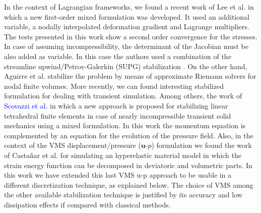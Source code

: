 \documentclass[11pt,english]{article}
\newcommand{\LM}[1]{\textcolor{blue}{#1}}
\begin{document}
In the context of Lagrangian frameworks, we found a recent work of Lee et al. \cite{lee2014development} in which a new first-order mixed formulation was developed. It used an additional variable, a nodally interpolated deformation gradient and Lagrange multipliers. The tests presented in this work show a second order convergence for the stresses. In case of assuming incompressibility, the  determinant of the Jacobian must be  also added as variable. In this case the authors used a combination of the streamline upwind/Petrov-Galerkin (SUPG) stabilization \cite{hughes1987new}. On the other hand, Aguirre et al. \cite{aguirre2014vertex} stabilize the problem by means of approximate Riemann solvers for nodal finite volumes.
More recently, we can found interesting stabilized formulation for dealing with transient simulation. Among others, the work of \LM{Scovazzi et al. \cite{scovazzi2016simple,abboud2021variational}} in which a new approach is proposed for stabilizing linear tetrahedral finite elements in case of nearly incompressible transient solid mechanics using a mixed formulation. In this work the momentum equation is complemented by an equation for the evolution of the pressure field. Also, in the context of the VMS displacement/pressure ($\boldsymbol{u}$-$p$) formulation we found the work of Castañar et al. \cite{castanar2020stabilized} for simulating an hyperelastic material model in which the strain energy function can be decomposed in deviatoric and volumetric parts. In this work we have extended this last VMS u-p approach to be usable in a different discretization technique, as explained below. The choice of VMS among the other available stabilization technique is justified by its accuracy and low dissipation effects if compared with classical methods.
\end{document}
